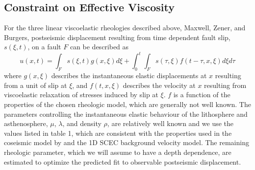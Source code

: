 \documentclass[12pt]{article}
\begin{document}
\subsection{Constraint on Effective Viscosity}\label{InitialInversion}
For the three linear viscoelastic rheologies described above, Maxwell, Zener, and Burgers, postseismic displacement resulting from time dependent fault slip, $s(\xi,t)$, on a fault $F$ can be described as  
\begin{equation}\label{GeneralForward}
  u(x,t) = \int_F s(\xi,t)g(x,\xi)d\xi + 
           \int_0^t\int_F s(\tau,\xi) f(t-\tau,x,\xi) d\xi d\tau
\end{equation}
where $g(x,\xi)$ describes the instantaneous elastic displacements at $x$ resulting from a unit of slip at $\xi$, and $f(t,x,\xi)$ describes the velocity at $x$ resulting from viscoelastic relaxation of stresses induced by slip at $\xi$. $f$ is a function of the properties of the chosen rheologic model, which are generally not well known.  The parameters controlling the instantaneous elastic behaviour of the lithosphere and asthenosphere, $\mu$, $\lambda$, and density $\rho$, are relatively well known and we use the values listed in table 1, which are consistent with the properties used in the coseismic model by \cite{Wei2011a} and the 1D SCEC background velocity model.  The remaining rheologic parameter, which we will assume to have a depth dependence, are estimated to optimize the predicted fit to observable postseismic displacement.
\end{document}
